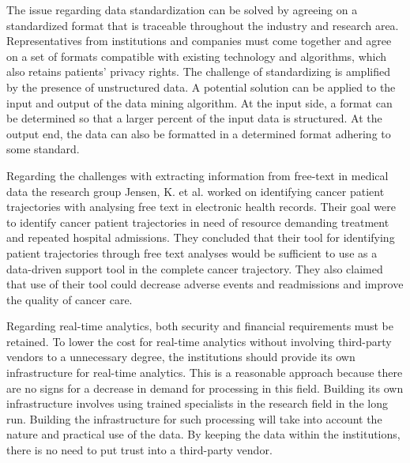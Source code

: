 The issue regarding data standardization can be solved by agreeing on a standardized format that is traceable throughout the industry and research area. Representatives from institutions and companies must come together and agree on a set of formats compatible with existing technology and algorithms, which also retains patients’ privacy rights. The challenge of standardizing is amplified by the presence of unstructured data. A potential solution can be applied to the input and output of the data mining algorithm. At the input side, a format can be determined so that a larger percent of the input data is structured. At the output end, the data can also be formatted in a determined format adhering to some standard.

Regarding the challenges with extracting information from free-text in medical data the research group Jensen, K. et al. worked on identifying cancer patient trajectories with analysing free text in electronic health records. Their goal were to identify cancer patient trajectories in need of resource demanding treatment and repeated hospital admissions. They concluded that their tool for identifying patient trajectories through free text analyses would be sufficient to use as a data-driven support tool in the complete cancer trajectory. They also claimed that use of their tool could decrease adverse events and readmissions and improve the quality of cancer care. 

Regarding real-time analytics, both security and financial requirements must be retained. To lower the cost for real-time analytics without involving third-party vendors to a unnecessary degree, the institutions should provide its own infrastructure for real-time analytics. This is a reasonable approach because there are no signs for a decrease in demand for processing in this field. Building its own infrastructure involves using trained specialists in the research field in the long run. Building the infrastructure for such processing will take into account the nature and practical use of the data. By keeping the data within the institutions, there is no need to put trust into a third-party vendor.

